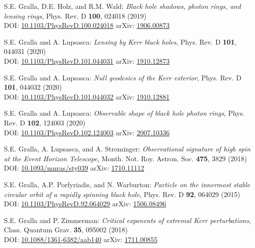 \begin{thebibliography}{123}
S.E. Gralla, D.E. Holz, and R.M. Wald:
{\em Black hole shadows, photon rings, and lensing rings},
Phys. Rev. D {\bf 100}, 024018 (2019)\\
DOI: \href{https://doi.org/10.1103/PhysRevD.100.024018}{10.1103/PhysRevD.100.024018}\hfill
arXiv: \href{https://arxiv.org/abs/1906.00873}{1906.00873}

S.E. Gralla and A. Lupsasca:
{\em Lensing by Kerr black holes},
Phys. Rev. D {\bf 101}, 044031 (2020)\\
DOI: \href{https://doi.org/10.1103/PhysRevD.101.044031}{10.1103/PhysRevD.101.044031}\hfill
arXiv: \href{https://arxiv.org/abs/1910.12873}{1910.12873}

S.E. Gralla and A. Lupsasca:
{\em Null geodesics of the Kerr exterior},
Phys. Rev. D {\bf 101}, 044032 (2020)\\
DOI: \href{https://doi.org/10.1103/PhysRevD.101.044032}{10.1103/PhysRevD.101.044032}\hfill
arXiv: \href{https://arxiv.org/abs/1910.12881}{1910.12881}

S.E. Gralla and A. Lupsasca:
{\em Observable shape of black hole photon rings},
Phys. Rev. D {\bf 102}, 124003 (2020)\\
DOI: \href{https://doi.org/10.1103/PhysRevD.102.124003}{10.1103/PhysRevD.102.124003}\hfill
arXiv: \href{https://arxiv.org/abs/2007.10336}{2007.10336}

S.E. Gralla, A. Lupsasca, and A. Strominger:
{\em Observational signature of high spin at the Event Horizon Telescope},
Month. Not. Roy. Astron. Soc. {\bf 475}, 3829 (2018)\\
DOI: \href{https://doi.org/10.1093/mnras/sty039}{10.1093/mnras/sty039}\hfill
arXiv: \href{https://arxiv.org/abs/1710.11112}{1710.11112}

S.E. Gralla, A.P. Porfyriadis, and N. Warburton:
{\em Particle on the innermost stable circular orbit of a rapidly spinning black hole},
Phys. Rev. D {\bf 92}, 064029 (2015)\\
DOI: \href{https://doi.org/10.1103/PhysRevD.92.064029}{10.1103/PhysRevD.92.064029}\hfill
arXiv: \href{https://arxiv.org/abs/1506.08496}{1506.08496}

S.E. Gralla and P. Zimmerman:
{\em Critical exponents of extremal Kerr perturbations},
Class. Quantum Grav. {\bf 35}, 095002 (2018)\\
DOI: \href{https://doi.org/10.1088/1361-6382/aab140}{10.1088/1361-6382/aab140}\hfill
arXiv: \href{https://arxiv.org/abs/1711.00855}{1711.00855}


\end{thebibliography}
